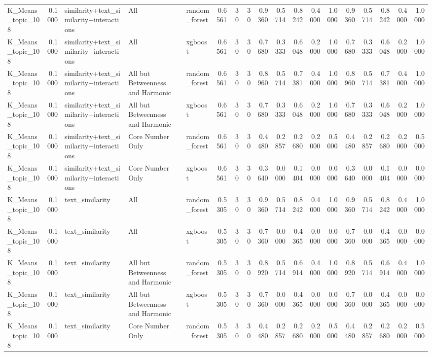 \begin{tabular}{lrlllrrrrrrrrrrrrr}
K_Means_topic_108 & 0.1000 & similarity+text_similarity+interactions & All & random_forest & 0.6561 & 30 & 30 & 0.9360 & 0.5714 & 0.8242 & 0.4000 & 1.0000 & 0.9360 & 0.5714 & 0.8242 & 0.4000 & 1.0000 \\
K_Means_topic_108 & 0.1000 & similarity+text_similarity+interactions & All & xgboost & 0.6561 & 30 & 30 & 0.7680 & 0.3333 & 0.6048 & 0.2000 & 1.0000 & 0.7680 & 0.3333 & 0.6048 & 0.2000 & 1.0000 \\
K_Means_topic_108 & 0.1000 & similarity+text_similarity+interactions & All but Betweenness and Harmonic & random_forest & 0.6561 & 30 & 30 & 0.8960 & 0.5714 & 0.7381 & 0.4000 & 1.0000 & 0.8960 & 0.5714 & 0.7381 & 0.4000 & 1.0000 \\
K_Means_topic_108 & 0.1000 & similarity+text_similarity+interactions & All but Betweenness and Harmonic & xgboost & 0.6561 & 30 & 30 & 0.7680 & 0.3333 & 0.6048 & 0.2000 & 1.0000 & 0.7680 & 0.3333 & 0.6048 & 0.2000 & 1.0000 \\
K_Means_topic_108 & 0.1000 & similarity+text_similarity+interactions & Core Number Only & random_forest & 0.6561 & 30 & 30 & 0.4480 & 0.2857 & 0.2680 & 0.2000 & 0.5000 & 0.4480 & 0.2857 & 0.2680 & 0.2000 & 0.5000 \\
K_Means_topic_108 & 0.1000 & similarity+text_similarity+interactions & Core Number Only & xgboost & 0.6561 & 30 & 30 & 0.3640 & 0.0000 & 0.1404 & 0.0000 & 0.0000 & 0.3640 & 0.0000 & 0.1404 & 0.0000 & 0.0000 \\
K_Means_topic_108 & 0.1000 & text_similarity & All & random_forest & 0.5305 & 30 & 30 & 0.9360 & 0.5714 & 0.8242 & 0.4000 & 1.0000 & 0.9360 & 0.5714 & 0.8242 & 0.4000 & 1.0000 \\
K_Means_topic_108 & 0.1000 & text_similarity & All & xgboost & 0.5305 & 30 & 30 & 0.7360 & 0.0000 & 0.4365 & 0.0000 & 0.0000 & 0.7360 & 0.0000 & 0.4365 & 0.0000 & 0.0000 \\
K_Means_topic_108 & 0.1000 & text_similarity & All but Betweenness and Harmonic & random_forest & 0.5305 & 30 & 30 & 0.8920 & 0.5714 & 0.6914 & 0.4000 & 1.0000 & 0.8920 & 0.5714 & 0.6914 & 0.4000 & 1.0000 \\
K_Means_topic_108 & 0.1000 & text_similarity & All but Betweenness and Harmonic & xgboost & 0.5305 & 30 & 30 & 0.7360 & 0.0000 & 0.4365 & 0.0000 & 0.0000 & 0.7360 & 0.0000 & 0.4365 & 0.0000 & 0.0000 \\
K_Means_topic_108 & 0.1000 & text_similarity & Core Number Only & random_forest & 0.5305 & 30 & 30 & 0.4480 & 0.2857 & 0.2680 & 0.2000 & 0.5000 & 0.4480 & 0.2857 & 0.2680 & 0.2000 & 0.5000 \\

\end{tabular}
